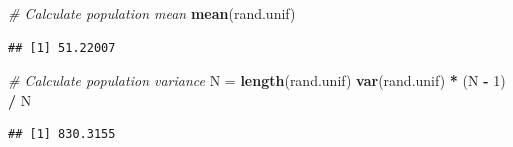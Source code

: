 \documentclass[]{book}
\newenvironment{Shaded}{\begin{snugshade}}{\end{snugshade}}
\newcommand{\CommentTok}[1]{\textcolor[rgb]{0.56,0.35,0.01}{\textit{#1}}}
\newcommand{\DataTypeTok}[1]{\textcolor[rgb]{0.13,0.29,0.53}{#1}}
\newcommand{\DecValTok}[1]{\textcolor[rgb]{0.00,0.00,0.81}{#1}}
\newcommand{\FloatTok}[1]{\textcolor[rgb]{0.00,0.00,0.81}{#1}}
\newcommand{\KeywordTok}[1]{\textcolor[rgb]{0.13,0.29,0.53}{\textbf{#1}}}
\newcommand{\NormalTok}[1]{#1}
\newcommand{\OperatorTok}[1]{\textcolor[rgb]{0.81,0.36,0.00}{\textbf{#1}}}
\newcommand{\StringTok}[1]{\textcolor[rgb]{0.31,0.60,0.02}{#1}}
\begin{document}
\begin{Shaded}
\begin{Highlighting}[]
\CommentTok{# Calculate population mean}
\KeywordTok{mean}\NormalTok{(rand.unif)}
\end{Highlighting}
\end{Shaded}

\begin{verbatim}
## [1] 51.22007
\end{verbatim}

\begin{Shaded}
\begin{Highlighting}[]
\CommentTok{# Calculate population variance}
\NormalTok{N =}\StringTok{ }\KeywordTok{length}\NormalTok{(rand.unif)}
\KeywordTok{var}\NormalTok{(rand.unif) }\OperatorTok{*}\StringTok{ }\NormalTok{(N }\OperatorTok{-}\StringTok{ }\DecValTok{1}\NormalTok{) }\OperatorTok{/}\StringTok{ }\NormalTok{N}
\end{Highlighting}
\end{Shaded}

\begin{verbatim}
## [1] 830.3155
\end{verbatim}

\begin{Shaded}
\end{Shaded}
\end{document}

